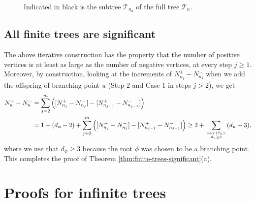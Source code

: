 \documentclass[11pt]{article}
\numberwithin{equation}{section}
\theoremstyle{plain}
\newcommand{\Tt}{\mathcal{T}}
\begin{document}
\begin{figure}[htbp]
{
}
\caption{Indicated in black is the subtree $\mathcal{T}_{n_3}$ of the full tree $\mathcal{T}_n$.}
\label{fig2}
\end{figure}


\subsection{All finite trees are significant}
\label{sec:sgn}

The above iterative construction has the property that the number of positive vertices is at least as large as the number of negative vertices, at every step $j\geq 1$. Moreover, by construction, looking at the increments of $N_{n_j}^+ - N_{n_j}^-$ when we add the offspring of branching point $u$ (Step 2 and Case 1 in steps $j>2$), we get
\begin{align*}
N_n^+ - N_n^{-}
&= \sum_{j=2}^{m} \left([N_{n_j}^+ - N_{n_j}^-] - [N_{n_{j-1}}^+ - N_{n_{j-1}}^-]\right)\\
&=1 + (d_\phi - 2) + \sum_{j=3}^{m}\left([N_{n_j}^+ - N_{n_j}^-] - [N_{n_{j-1}}^+ - N_{n_{j-1}}^-]\right)
\geq 2 + \sum_{ {u\in V(\Tt_n):} \atop {d_u \geq 3} }(d_u-3),
\end{align*}
where we use that $d_\phi \geq 3$ because the root $\phi$ was chosen to be a branching point. This completes the proof of Theorem \ref{thm:finite-trees-significant}(a).





\section{Proofs for infinite trees}
\label{sec:infinite-trees}
\end{document}
